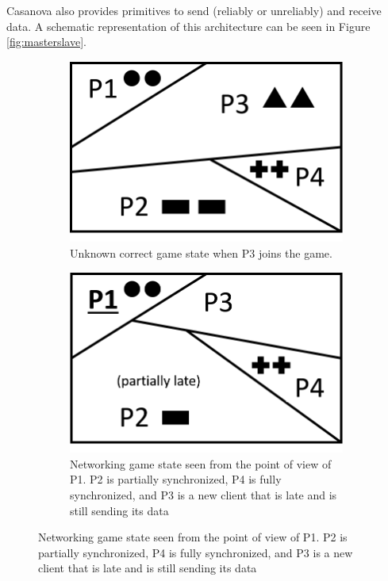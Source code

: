 Casanova also provides primitives to send (reliably or unreliably) and receive data. A schematic representation of this architecture can be seen in Figure \ref{fig:masterslave}.

\begin{figure}[h!]
	\centering
	\caption{Representation of the game world in a networking scenario}
	\label{fig:network_world}
	\begin{subfigure}[t]{0.3\linewidth}
		\centering
		\includegraphics[width=1\linewidth]{Figures/networking2}
		\caption{Unknown correct game state when P3 joins the game.\\}
		\label{subfig:networking_ideal}
	\end{subfigure}
	\begin{subfigure}[t]{0.3\linewidth}
		\centering
		\includegraphics[width=1\linewidth]{Figures/networking1}
		\caption{Networking game state seen from the point of view of P1. P2 is partially synchronized, P4 is fully synchronized, and P3 is a new client that is late and is still sending its data}
		\label{subfig:networking_relative}
	\end{subfigure}
	
	
\end{figure}

